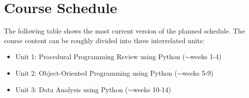 \documentclass[11pt]{article}
\begin{document}
\section{Course Schedule}
The following table shows the most current version of the planned schedule. The course content can be roughly divided into three interrelated units:

\begin{itemize}
	\item Unit 1: Procedural Programming Review using Python ($\sim$weeks 1-4)
	\item Unit 2: Object-Oriented Programming using Python ($\sim$weeks 5-9)
	\item Unit 3: Data Analysis using Python ($\sim$weeks 10-14)
\end{itemize}

\end{document}
